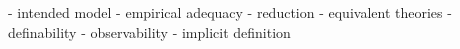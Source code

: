 
- intended model
- empirical adequacy
- reduction
- equivalent theories
- definability
- observability
- implicit definition


